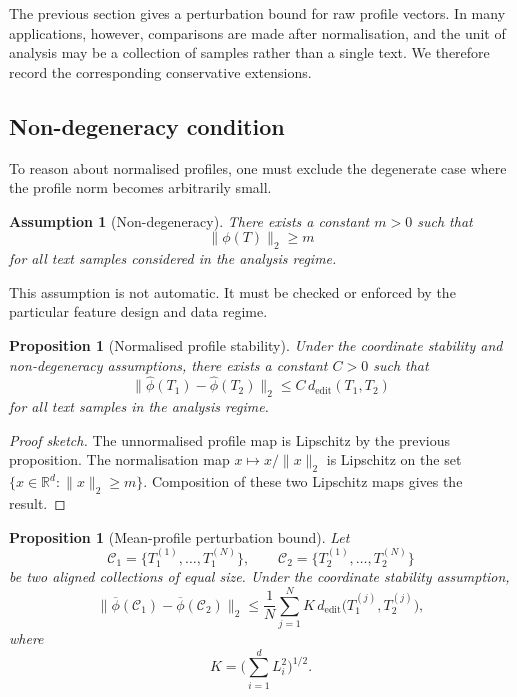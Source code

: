 \documentclass[11pt]{article}
\newtheorem{assumption}[definition]{Assumption}
\newtheorem{proposition}[definition]{Proposition}
\begin{document}
The previous section gives a perturbation bound for raw profile vectors. In many applications, however, comparisons are made after normalisation, and the unit of analysis may be a collection of samples rather than a single text. We therefore record the corresponding conservative extensions.

\subsection{Non-degeneracy condition}

To reason about normalised profiles, one must exclude the degenerate case where the profile norm becomes arbitrarily small.

\begin{assumption}[Non-degeneracy]
There exists a constant $m > 0$ such that
\[
\|\phi(T)\|_2 \geq m
\]
for all text samples considered in the analysis regime.
\end{assumption}

This assumption is not automatic. It must be checked or enforced by the particular feature design and data regime.

\begin{proposition}[Normalised profile stability]
Under the coordinate stability and non-degeneracy assumptions, there exists a constant $C > 0$ such that
\[
\|\widehat{\phi}(T_1) - \widehat{\phi}(T_2)\|_2 \leq C\, d_{\mathrm{edit}}(T_1, T_2)
\]
for all text samples in the analysis regime.
\end{proposition}

\begin{proof}[Proof sketch]
The unnormalised profile map is Lipschitz by the previous proposition. The normalisation map $x \mapsto x / \|x\|_2$ is Lipschitz on the set $\{x \in \mathbb{R}^d : \|x\|_2 \geq m\}$. Composition of these two Lipschitz maps gives the result.
\end{proof}

\begin{proposition}[Mean-profile perturbation bound]
Let
\[
\mathcal{C}_1 = \{T_1^{(1)}, \ldots, T_1^{(N)}\}, \qquad
\mathcal{C}_2 = \{T_2^{(1)}, \ldots, T_2^{(N)}\}
\]
be two aligned collections of equal size. Under the coordinate stability assumption,
\[
\|\overline{\phi}(\mathcal{C}_1) - \overline{\phi}(\mathcal{C}_2)\|_2
\leq
\frac{1}{N} \sum_{j=1}^{N} K\, d_{\mathrm{edit}}\big(T_1^{(j)}, T_2^{(j)}\big),
\]
where
\[
K = \Big(\sum_{i=1}^{d} L_i^2\Big)^{1/2}.
\]
\end{proposition}
\end{document}
